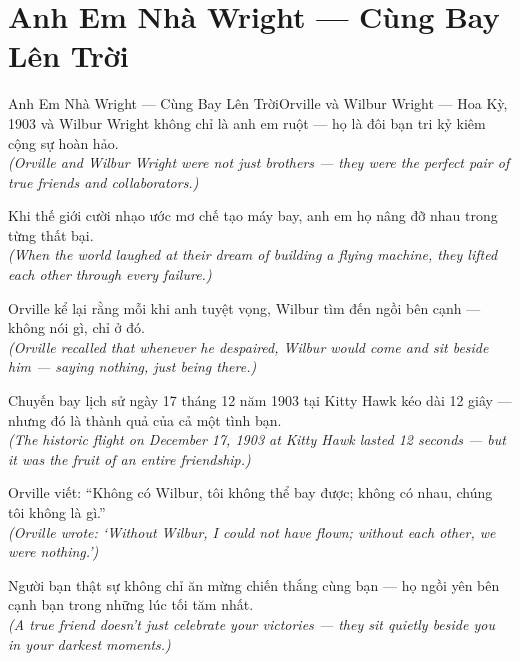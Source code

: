 \section{Anh Em Nhà Wright --- Cùng Bay Lên Trời}
\begin{truyen}{Anh Em Nhà Wright --- Cùng Bay Lên Trời}{Orville và Wilbur Wright --- Hoa Kỳ, 1903}
 và Wilbur Wright không chỉ là anh em ruột --- họ là đôi bạn tri kỷ kiêm cộng sự hoàn hảo.\\[4pt]
\textit{(Orville and Wilbur Wright were not just brothers --- they were the perfect pair of true friends and collaborators.)}

Khi thế giới cười nhạo ước mơ chế tạo máy bay, anh em họ nâng đỡ nhau trong từng thất bại.\\[4pt]
\textit{(When the world laughed at their dream of building a flying machine, they lifted each other through every failure.)}

Orville kể lại rằng mỗi khi anh tuyệt vọng, Wilbur tìm đến ngồi bên cạnh --- không nói gì, chỉ ở đó.\\[4pt]
\textit{(Orville recalled that whenever he despaired, Wilbur would come and sit beside him --- saying nothing, just being there.)}

Chuyến bay lịch sử ngày 17 tháng 12 năm 1903 tại Kitty Hawk kéo dài 12 giây --- nhưng đó là thành quả của cả một tình bạn.\\[4pt]
\textit{(The historic flight on December 17, 1903 at Kitty Hawk lasted 12 seconds --- but it was the fruit of an entire friendship.)}

Orville viết: ``Không có Wilbur, tôi không thể bay được; không có nhau, chúng tôi không là gì.''\\[4pt]
\textit{(Orville wrote: `Without Wilbur, I could not have flown; without each other, we were nothing.')}

\end{truyen}
\begin{baihoc}
  Người bạn thật sự không chỉ ăn mừng chiến thắng cùng bạn --- họ ngồi yên bên cạnh bạn trong những lúc tối tăm nhất.\\[4pt]
  \textit{(A true friend doesn't just celebrate your victories --- they sit quietly beside you in your darkest moments.)}
\end{baihoc}

